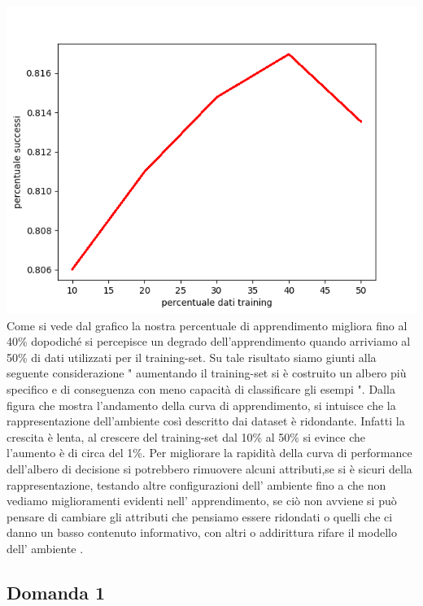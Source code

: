 		\includegraphics[scale=0.86]{performance.png}
		Come si vede dal grafico la nostra percentuale di apprendimento migliora fino al 40\% dopodiché si percepisce un degrado dell'apprendimento quando arriviamo al 50\% di dati utilizzati per il training-set.
		\newline
		 Su tale risultato siamo giunti alla seguente considerazione " aumentando il training-set si è costruito un albero più specifico e di conseguenza  con meno capacità di classificare gli esempi ".
		 Dalla figura che mostra l'andamento della curva di apprendimento, si intuisce che la rappresentazione dell'ambiente così descritto dai dataset è ridondante.
		  Infatti la crescita è lenta, al crescere del training-set dal 10\% al 50\% si evince che l'aumento è di circa del 1\%.
		  Per migliorare la rapidità della curva di performance dell'albero di decisione si potrebbero rimuovere alcuni attributi,se si è sicuri della rappresentazione, testando altre configurazioni dell' ambiente fino a che non vediamo miglioramenti evidenti nell' apprendimento, se ciò non avviene si può pensare di cambiare gli attributi che pensiamo essere ridondati o quelli che ci danno un basso contenuto informativo, con altri o addirittura rifare il modello dell' ambiente . 
		\subsection{Domanda 1}
		
